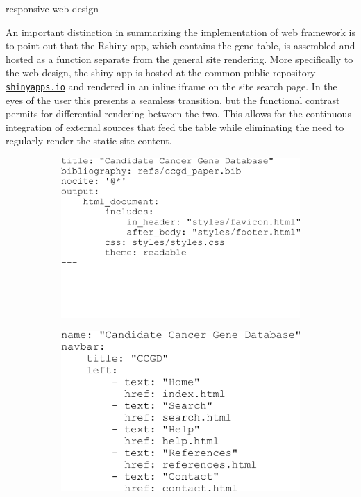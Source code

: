 \documentclass[10pt]{report}
\begin{document}
responsive web design

An important distinction in summarizing the implementation of web framework is to point out that the Rshiny app, which contains the gene table, is assembled and hosted as a function separate from the general site rendering. More specifically to the web design, the shiny app is hosted at the common public repository \href{https://ctastad.shinyapps.io/table_app/}{\texttt{shinyapps.io}} and rendered in an inline iframe on the site search page. In the eyes of the user this presents a seamless transition, but the functional contrast permits for differential rendering between the two. This allows for the continuous integration of external sources that feed the table while eliminating the need to regularly render the static site content.

\begin{figure}
\centering
\begin{subfigure}[t]{.4\textwidth}
    \centering
    \includegraphics[width=\textwidth]{fig/page_header.png}
\label{fig:pageHeader}
\end{subfigure}%
\hspace{5em}
\begin{subfigure}[t]{.4\textwidth}
    \centering
    \includegraphics[width=\textwidth]{fig/site_header.png}

\end{subfigure}
\end{figure}
\end{document}

